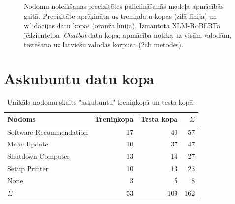 \begin{figure}[h] 
   \centering
   \caption{Nodomu noteikšanas precizitātes palielināšanās modeļa apmācībās gaitā. Precizitāte aprēķināta uz treniņdatu kopas (zilā līnija) un validācijas datu kopas (oranžā līnija). Izmantota XLM-RoBERTa jēdzientelpa, \textit{Chatbot} datu kopa, apmācība notika uz visām valodām, testēšana uz latviešu valodas korpusa (2ab metodes).} 
   \label{fig:chatbot-xlm-all}
\end{figure}



\section{Askubuntu datu kopa}

\begin{table}[htbp]
  \centering
  \caption{Unikālo nodomu skaits "askubuntu" treniņkopā un testa kopā.}
    \begin{tabular}{lrrr} \toprule
    Nodoms & Treniņkopā & Testa kopā & $\Sigma$ \\\midrule
    Software Recommendation & 17    & 40 & 57 \\
    Make Update & 10    & 37 & 47 \\
    Shutdown Computer & 13    & 14 & 27 \\
    Setup Printer & 10    & 13 & 23\\
    None  & 3     & 5 & 8\\
   $\Sigma$ & 53    & 109 & 162 \\\bottomrule
    \end{tabular}%
  \label{tab:askubuntu-labels}%
\end{table}%



